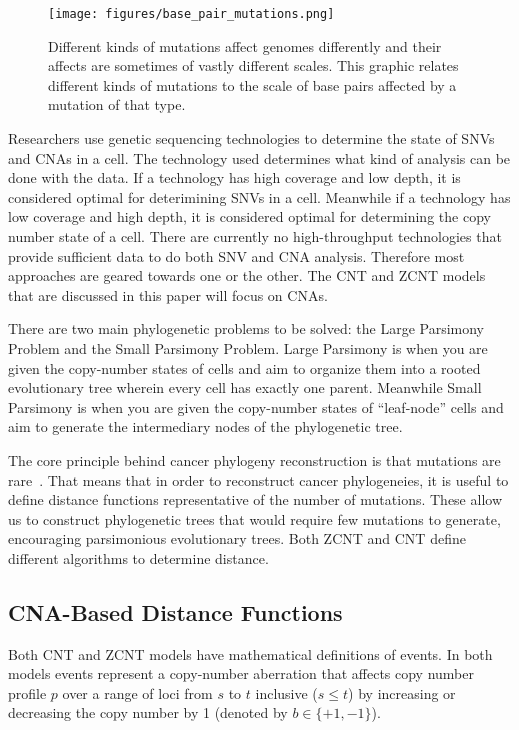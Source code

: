 \begin{figure}[ht]\label{fig:mutation_freq}
    \centering
    \texttt{[image: figures/base\_pair\_mutations.png]}
    \caption{Different kinds of mutations affect genomes differently and their affects are sometimes of vastly different scales. This graphic relates different kinds of mutations to the scale of base pairs affected by a mutation of that type.~\cite{lecture_2}}
\end{figure}

Researchers use genetic sequencing technologies to determine the state of SNVs and CNAs in a cell. The technology used determines what kind of analysis can be done with the data. If a technology has high coverage and low depth, it is considered optimal for deterimining SNVs in a cell. Meanwhile if a technology has low coverage and high depth, it is considered optimal for determining the copy number state of a cell. There are currently no high-throughput technologies that provide sufficient data to do both SNV and CNA analysis. Therefore most approaches are geared towards one or the other. The CNT and ZCNT models that are discussed in this paper will focus on CNAs. 

There are two main phylogenetic problems to be solved: the Large Parsimony Problem and the Small Parsimony Problem. Large Parsimony is when you are given the copy-number states of cells and aim to organize them into a rooted evolutionary tree wherein every cell has exactly one parent. Meanwhile Small Parsimony is when you are given the copy-number states of ``leaf-node'' cells and aim to generate the intermediary nodes of the phylogenetic tree. 

The core principle behind cancer phylogeny reconstruction is that mutations are rare~\cite{mutations_rare}. That means that in order to reconstruct cancer phylogeneies, it is useful to define distance functions representative of the number of mutations. These allow us to construct phylogenetic trees that would require few mutations to generate, encouraging parsimonious evolutionary trees. Both ZCNT and CNT define different algorithms to determine distance. 

\subsection{CNA-Based Distance Functions}

Both CNT and ZCNT models have mathematical definitions of events. In both models events represent a copy-number aberration that affects copy number profile $p$ over a range of loci from $s$ to $t$ inclusive ($s \leq t$) by increasing or decreasing the copy number by 1 (denoted by $b \in \{+1, -1\}$). 

